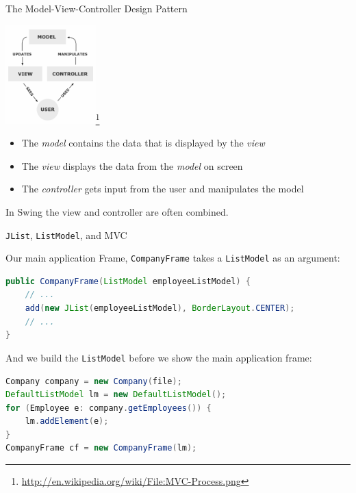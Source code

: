 \documentclass{beamer}
\begin{document}
\begin{frame}[fragile]{The Model-View-Controller Design Pattern}
\vspace{-.1in}
\begin{center}
\includegraphics[height=1.5in]{MVC-Process.png}\footnote{\url{http://en.wikipedia.org/wiki/File:MVC-Process.png}}
\end{center}
\vspace{-.1in}
\begin{itemize}
\item The {\it model} contains the data that is displayed by the {\it view}
\item The {\it view} displays the data from the {\it model} on screen
\item The {\it controller} gets input from the user and manipulates the model
\end{itemize}
In Swing the view and controller are often combined.

\end{frame}

\begin{frame}[fragile]{{\tt JList}, {\tt ListModel}, and MVC}


Our main application Frame, {\tt CompanyFrame} takes a {\tt ListModel} as an argument:
\begin{lstlisting}[language=Java]
public CompanyFrame(ListModel employeeListModel) {
    // ...
    add(new JList(employeeListModel), BorderLayout.CENTER);
    // ...
}
\end{lstlisting}
And we build the {\tt ListModel} before we show the main application frame:
\begin{lstlisting}[language=Java]
Company company = new Company(file);
DefaultListModel lm = new DefaultListModel();
for (Employee e: company.getEmployees()) {
    lm.addElement(e);
}
CompanyFrame cf = new CompanyFrame(lm);
\end{lstlisting}


\end{frame}
\end{document}
